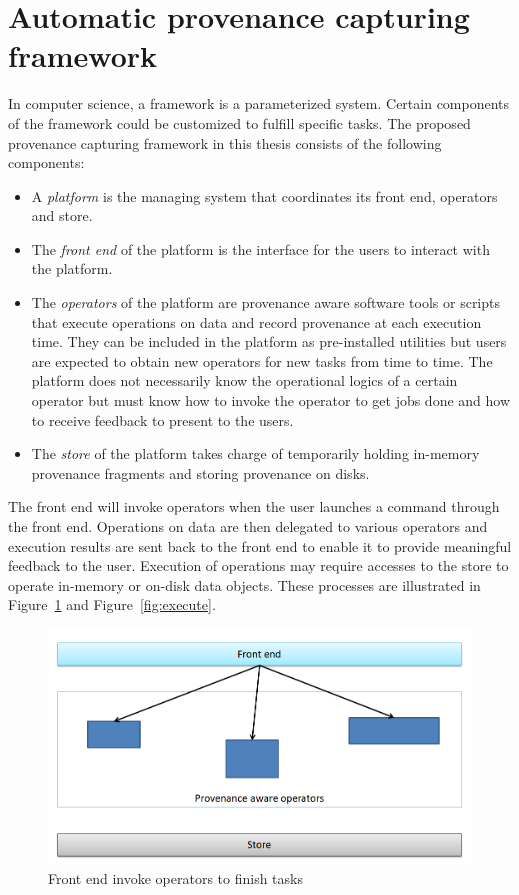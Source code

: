 \section{Automatic provenance capturing framework}
In computer science, a framework is a parameterized system. Certain components of the framework could be customized to fulfill specific tasks. The proposed provenance capturing framework in this thesis consists of the following components:
\begin{itemize}
	\item A \emph{platform} is the managing system that coordinates its front end, operators and store.
	\item The \emph{front end} of the platform is the interface for the users to interact with the platform.
	\item The \emph{operators} of the platform are provenance aware software tools or scripts that execute operations on data and record provenance at each execution time. They can be included in the platform as pre-installed utilities but users are expected to obtain new operators for new tasks from time to time. The platform does not necessarily know the operational logics of a certain operator but must know how to invoke the operator to get jobs done and how to receive feedback to present to the users.
	\item The \emph{store} of the platform takes charge of temporarily holding in-memory provenance fragments and storing provenance on disks.
\end{itemize}
The front end will invoke operators when the user launches a command through the front end. Operations on data are then delegated to various operators and execution results are sent back to the front end to enable it to provide meaningful feedback to the user. Execution of operations may require accesses to the store to operate in-memory or on-disk data objects. These processes are illustrated in Figure~\ref{fig:invoke} and Figure~\ref{fig:execute}.
\begin{figure}
	\includegraphics[width=\textwidth]{invoke.png}
	\caption{Front end invoke operators to finish tasks}
	\label{fig:invoke}
\end{figure}
